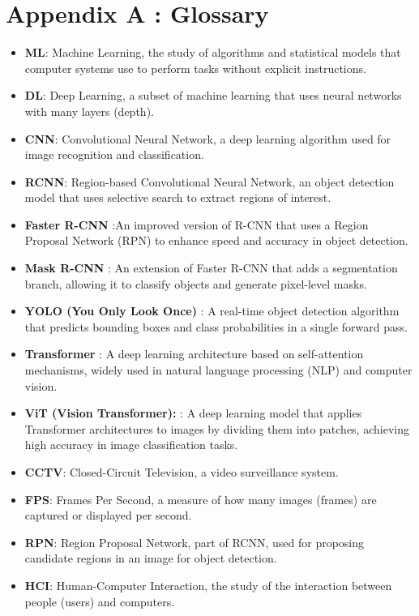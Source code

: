 \documentclass[11pt]{report}
\begin{document}
\chapter{Appendix A : Glossary}

\begin{itemize}
    \item \textbf{ML}: Machine Learning, the study of algorithms and statistical models that computer systems use to perform tasks without explicit instructions.
    \item \textbf{DL}: Deep Learning, a subset of machine learning that uses neural networks with many layers (depth).
    \item \textbf{CNN}: Convolutional Neural Network, a deep learning algorithm used for image recognition and classification.
    \item \textbf{RCNN}: Region-based Convolutional Neural Network, an object detection model that uses selective search to extract regions of interest.
    \item \textbf{Faster R-CNN} :An improved version of R-CNN that uses a Region Proposal Network (RPN) to enhance speed and accuracy in object detection.
    \item \textbf{Mask R-CNN} : An extension of Faster R-CNN that adds a segmentation branch, allowing it to classify objects and generate pixel-level masks.
    \item \textbf{YOLO (You Only Look Once)} : A real-time object detection algorithm that predicts bounding boxes and class probabilities in a single forward pass.
    \item \textbf{Transformer} : A deep learning architecture based on self-attention mechanisms, widely used in natural language processing (NLP) and computer vision.
    \item \textbf{ViT (Vision Transformer): } : A deep learning model that applies Transformer architectures to images by dividing them into patches, achieving high accuracy in image classification tasks.
    \item \textbf{CCTV}: Closed-Circuit Television, a video surveillance system.
    \item \textbf{FPS}: Frames Per Second, a measure of how many images (frames) are captured or displayed per second.
    \item \textbf{RPN}: Region Proposal Network, part of RCNN, used for proposing candidate regions in an image for object detection.
    \item \textbf{HCI}: Human-Computer Interaction, the study of the interaction between people (users) and computers.

\end{itemize}
\end{document}
